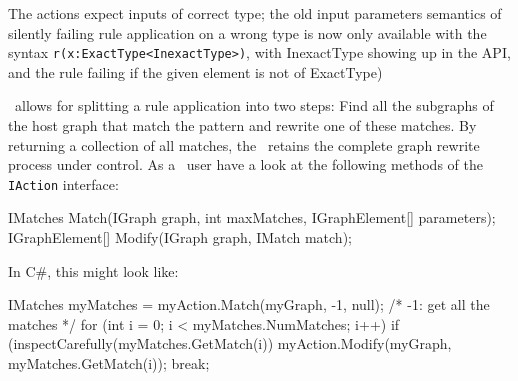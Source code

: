 The actions expect inputs of correct type; the old input parameters semantics
of silently failing rule application on a wrong type is now only available 
with the syntax \verb#r(x:ExactType<InexactType>)#, with InexactType showing up in the API,
and the rule failing if the given element is not of ExactType)

\LibGr\ allows for splitting a rule application into two steps: Find all the subgraphs of the host graph that match the pattern and rewrite one of these matches. 
By returning a collection of all matches, the \LibGr\ retains the complete graph rewrite process under control.
As a \LibGr\ user have a look at the following methods of the \verb#IAction# interface:
\begin{csharplet}
IMatches Match(IGraph graph, int maxMatches, IGraphElement[] parameters);
IGraphElement[] Modify(IGraph graph, IMatch match);
\end{csharplet}
In C\#, this might look like:
\begin{csharplet}
IMatches myMatches = myAction.Match(myGraph, -1, null); /* -1: get all the matches */
for (int i = 0; i < myMatches.NumMatches; i++)
{
	if (inspectCarefully(myMatches.GetMatch(i))
	{
		myAction.Modify(myGraph, myMatches.GetMatch(i));
		break;
  	}
}
\end{csharplet}


